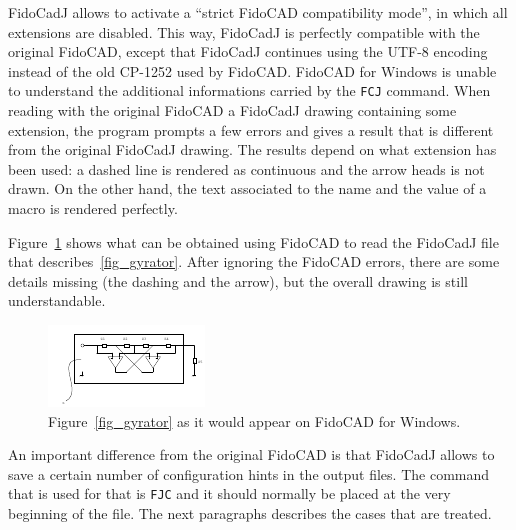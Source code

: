 \documentclass[10pt,a4paper,twoside]{scrreprt}
\begin{document}
FidoCadJ allows to activate a ``strict FidoCAD compatibility mode'', in which all extensions are disabled. This way, FidoCadJ is perfectly compatible with the original FidoCAD, except that FidoCadJ continues using the UTF-8 encoding instead of the old CP-1252 used by FidoCAD.
FidoCAD for Windows is unable to understand the additional informations carried by the \lstinline!FCJ! command. When reading with the original FidoCAD a FidoCadJ drawing containing some extension, the program prompts a few errors and gives a result that is different from the original FidoCadJ drawing.
The results depend on what extension has been used: a dashed line is rendered as continuous and the arrow heads is not drawn. On the other hand, the text associated to the name and the value of a macro is rendered perfectly.

Figure~\ref{fig_gyrator_n} shows what can be obtained using FidoCAD to read the FidoCadJ file that describes~\ref{fig_gyrator}. After ignoring the FidoCAD errors, there are some details missing (the dashing and the arrow), but the overall drawing is still understandable.

\begin{figure}
\includegraphics[width=\textwidth]{gyrator_n}
\caption{Figure~\ref{fig_gyrator} as it would appear on FidoCAD for Windows.}
\label{fig_gyrator_n}
\end{figure}

An important difference from the original FidoCAD is that FidoCadJ allows to save a certain number of configuration hints in the output files. The command that is used for that is \lstinline!FJC! and it should normally be placed at the very beginning of the file. The next paragraphs describes the cases that are treated.
\end{document}
